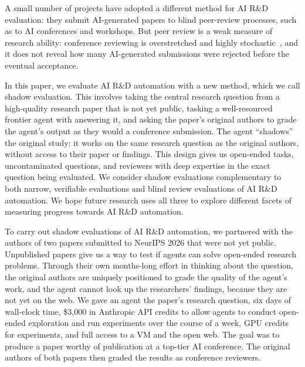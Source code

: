 \documentclass[]{crux} %
\begin{document}
A small number of projects have adopted a different method for AI R\&D
evaluation: they submit AI-generated papers to blind peer-review processes,
such as to AI conferences and workshops. But peer review is a weak measure of
research ability: conference reviewing is overstretched and highly
stochastic~\citep{peerreview2014,peerreview2021,peerreviewchallenges}, and it does not reveal how many AI-generated submissions were
rejected before the eventual acceptance.

In this paper, we evaluate AI R\&D automation with a new method, which we call
shadow evaluation. This involves taking the central research question from a
high-quality research paper that is not yet public, tasking a well-resourced
frontier agent with answering it, and asking the paper's original authors to
grade the agent's output as they would a conference submission. The agent
``shadows'' the original study: it works on the same research question as the
original authors, without access to their paper or findings. This design gives
us open-ended tasks, uncontaminated questions, and reviewers with deep
expertise in the exact question being evaluated. We consider shadow
evaluations complementary to both narrow, verifiable evaluations and blind
review evaluations of AI R\&D automation. We hope future research uses all
three to explore different facets of measuring progress towards AI R\&D
automation.

To carry out shadow evaluations of AI R\&D automation, we partnered with the
authors of two papers submitted to NeurIPS 2026 that were not yet public.
Unpublished papers give us a way to test if agents can solve open-ended
research problems. Through their own months-long effort in thinking about the
question, the original authors are uniquely positioned to grade the quality of
the agent's work, and the agent cannot look up the researchers' findings,
because they are not yet on the web. We gave an agent the paper's research
question, six days of wall-clock time, \$3{,}000 in Anthropic API credits to
allow agents to conduct open-ended exploration and run experiments over the
course of a week, GPU credits for experiments, and full access to a VM and the
open web. The goal was to produce a paper worthy of publication at a top-tier
AI conference. The original authors of both papers then graded the results as
conference reviewers.

\begin{table}[t]
  \centering
  \caption{Summary of the original paper authors' reviews of the agents'
  submitted work. Section~\ref{sec:setup} contains additional details on our setup and Appendix~\ref{app:research-questions} outlines the research questions and relevant context for both papers.}
  \label{tab:ratings}
  
\end{table}
\end{document}
